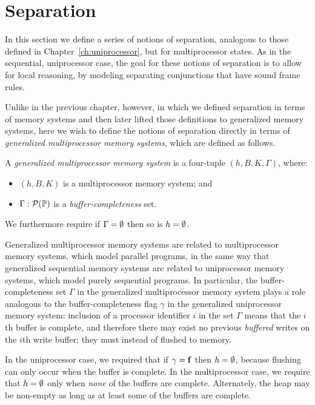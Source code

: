 \documentclass[11pt]{report}
\begin{document}
\section{Separation}
\label{sec:separation}

In this section we define a series of notions of separation, analogous to those defined in Chapter~\ref{ch:uniprocessor}, but for multiprocessor states. As in the sequential, uniprocessor case, the goal for these notions of separation is to allow for local reasoning, by modeling separating conjunctions that have sound frame rules. 

Unlike in the previous chapter, however, in which we defined separation in terms of memory systems and then later lifted those definitions to generalized memory systems, here we wish to define the notions of separation directly in terms of \emph{generalized multiprocessor memory systems}, which are defined as follows. 

\begin{definition}
  A \emph{generalized multiprocessor memory system} is a four-tuple $(h,B,K,\Gamma)$, where: 
  \begin{itemize}
    \item $(h,B,K)$ is a multiprocessor memory system; and 
    \item $\Gamma : \mathcal{P}(\mathbb{P})$ is a \emph{buffer-completeness} set. 
  \end{itemize} We furthermore require if $\Gamma = \operatorname{\emptyset}$ then so is $h = \operatorname{\emptyset}$. 
\end{definition}

Generalized multiprocessor memory systems are related to multiprocessor memory systems, which model parallel programs, in the same way that generalized sequential memory systems are related to uniprocessor memory systems, which model purely sequential programs. In particular, the buffer-completeness set $\Gamma$ in the generalized multiprocessor memory system plays a role analogous to the buffer-completeness flag $\gamma$ in the generalized uniprocessor memory system: inclusion of a processor identifier $i$ in the set $\Gamma$ means that the $i$th buffer is complete, and therefore there may exist no previous \emph{buffered} writes on the $i$th write buffer; they must instead of flushed to memory. 

In the uniprocessor case, we required that if $\gamma = \mathbf{f}$ then $h = \operatorname{\emptyset}$, because flushing can only occur when the buffer is complete. In the multiprocessor case, we require that $h = \operatorname{\emptyset}$ only when \emph{none} of the buffers are complete. Alternately, the heap may be non-empty as long as at least some of the buffers are complete. 
\end{document}
